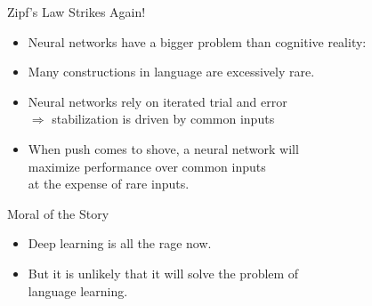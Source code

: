\documentclass[xcolor={usenames,svgnames,x11names,dvipsnames,table}]{beamer}
\begin{document}
\begin{frame}{Zipf's Law Strikes Again!}
    \begin{itemize}
        \item Neural networks have a bigger problem than cognitive reality:\\
        \item Many constructions in language are excessively rare.
        \item Neural networks rely on iterated trial and error\\
            $\Rightarrow$ stabilization is driven by common inputs
        \item When push comes to shove, a neural network will\\
            maximize performance over common inputs\\
            at the expense of rare inputs.
    \end{itemize}

    \pause
    \begin{block}{Moral of the Story}
        \begin{itemize}
            \item Deep learning is all the rage now.
            \item But it is unlikely that it will solve the problem of\\
                language learning. 
        \end{itemize}
    \end{block}
\end{frame}
\end{document}
